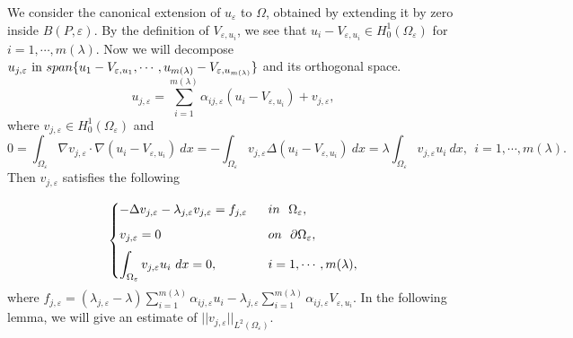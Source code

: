 \documentclass[11pt,reqno]{article}
\numberwithin{equation}{section}
\newcommand\e\varepsilon
\newcommand\la\lambda
\renewcommand\O\Omega
\begin{document}
     We consider the canonical extension of $u_\e$ to $\Omega$, obtained by extending it by zero inside $B(P,\e)$.
     By the definition of $V_{\e,u_i}$, we see that $u_i-V_{\e,u_i}\in H_0^1(\O_\e)$ for $i=1,\cdots,m(\lambda)$.
 Now we will decompose $u_{j,\e} \hbox{ in } span\{u_1-V_{\e,u_1},\cdots,u_{m(\lambda)}-V_{\e,u_{m(\lambda)}}\}$ and its orthogonal space. 
\begin{equation}\label{eq15112025-1}
    u_{j,\e}=\sum_{i=1}^{m(\la)}\alpha_{ij,\e} (u_i-V_{\e,u_i})+ v_{j,\e},
\end{equation}
where 
$v_{j,\e}\in H_0^1(\O_\e)$ and 
\begin{equation}\label{eq15112025-2}
  0=\int_{\O_\e} \nabla v_{j,\e} \cdot\nabla(u_i-V_{\e,u_i})\ dx= -\int_{\O_\e}  v_{j,\e} \Delta (u_i-V_{\e,u_i})\ dx=\lambda\int_{\O_\e}  v_{j,\e} u_i\ dx,\ \ i=1,\cdots,m(\lambda).
\end{equation}
Then $v_{j,\e}$ satisfies the following 

\begin{equation}\label{eq2301-4}
    \begin{cases}
       \displaystyle -\Delta v_{j,\e}-\lambda_{j,\e}v_{j,\e}=f_{j,\e}\ \ &in \ \ \O_\e,\vspace{2mm}\\
       \displaystyle v_{j,\e}=0\ \ &on \ \ \partial\O_\e,\vspace{2mm}\\
      \displaystyle \int_{\O_\e}  v_{j,\e} u_i\ dx= 0,\ \ &i=1,\cdots,m(\lambda),
    \end{cases}
\end{equation}
where $f_{j,\e}=(\lambda_{j,\e}-\lambda)\sum_{i=1}^{m(\la)}\alpha_{ij,\e}  u_i-\lambda_{j,\e}\sum_{i=1}^{m(\la)}\alpha_{ij,\e}  V_{\e,u_i} .$
In the following  lemma, we will give an estimate of $||v_{j,\e}||_{L^2(\O_\e)}$.
\end{document}
